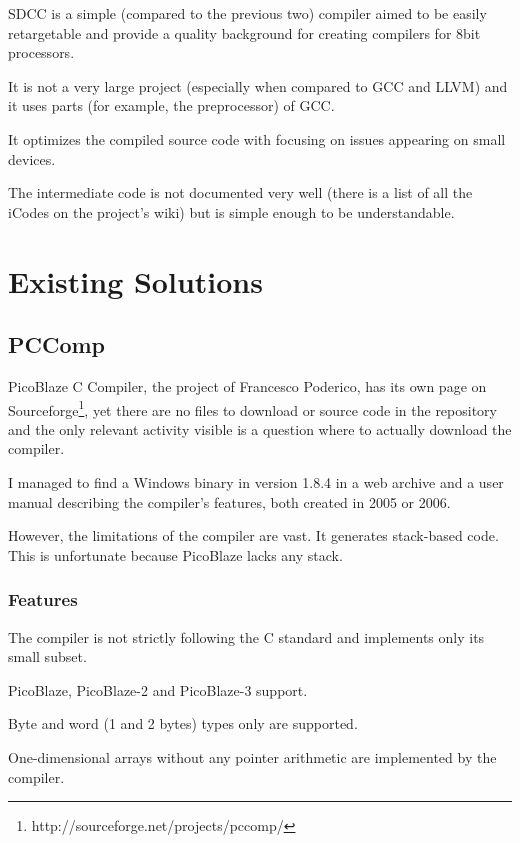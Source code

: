     SDCC is a simple (compared to the previous two) compiler aimed to be easily retargetable and provide a quality background for creating compilers for 8bit processors.\cite{SdccWeb}

    It is not a very large project (especially when compared to GCC and LLVM) and it uses parts (for example, the preprocessor) of GCC.

    It optimizes the compiled source code with focusing on issues appearing on small devices.

    The intermediate code is not documented very well (there is a list of all the iCodes on the project's wiki) but is simple enough to be understandable.

\chapter{Existing Solutions}\label{existing}

    \section{PCComp}\label{pccomp}

    PicoBlaze C Compiler, the project of Francesco Poderico, has its own page on Sourceforge\footnote{http://sourceforge.net/projects/pccomp/},
    yet there are no files to download or source code in the repository and the only relevant activity visible is a question where to actually download the compiler.

    I managed to find a Windows binary in version 1.8.4 in a web archive and a user manual describing the compiler's features, both created in 2005 or 2006.

    However, the limitations of the compiler are vast. It generates stack-based code. This is unfortunate because PicoBlaze lacks any stack.\cite{pccompman}

        \subsection{Features}

        The compiler is not strictly following the C standard and implements only its small subset.

        PicoBlaze, PicoBlaze-2 and PicoBlaze-3 support.

        Byte and word (1 and 2 bytes) types only are supported.

        One-dimensional arrays without any pointer arithmetic are implemented by the compiler.

